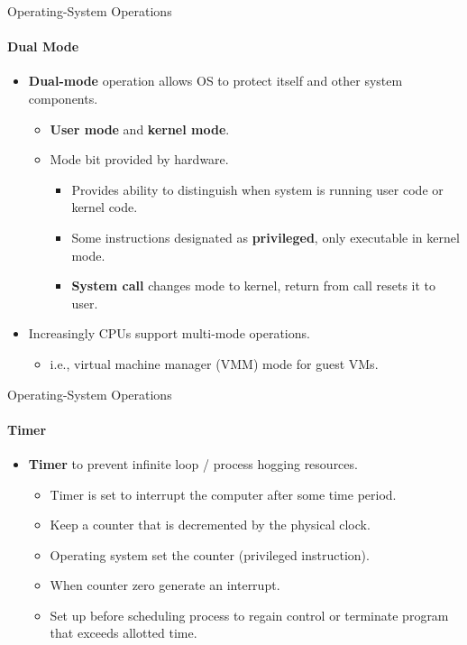 \documentclass[10pt]{beamer}
\begin{document}
\begin{frame}{Operating-System Operations}
\framesubtitle{Dual Mode}
\begin{itemize}
\item \textbf{\alert{Dual-mode}} operation allows OS to protect itself and other system components.
\begin{itemize}
\item \textbf{\alert{User mode}} and \textbf{\alert{kernel mode}}.
\item \alert{Mode bit} provided by hardware.
\begin{itemize}
\item Provides ability to distinguish when system is running user code or kernel code.
\item Some instructions designated as \textbf{\alert{privileged}}, only executable in kernel mode.
\item \textbf{\alert{System call}} changes mode to kernel, return from call resets it to user.
\end{itemize}
\end{itemize}
\item Increasingly CPUs support multi-mode operations.
\begin{itemize}
\item i.e., \alert{virtual machine manager} (\alert{VMM}) mode for guest \alert{VMs}.
\end{itemize}
\end{itemize}
\end{frame}


\begin{frame}{Operating-System Operations}
\framesubtitle{Timer}
\begin{itemize}
\item \textbf{\alert{Timer}} to prevent infinite loop / process hogging resources.
\begin{itemize}
\item Timer is set to interrupt the computer after some time period.
\item Keep a counter that is decremented by the physical clock.
\item Operating system set the counter (privileged instruction).
\item When counter zero generate an interrupt.
\item Set up before scheduling process to regain control or terminate program that exceeds allotted time.
\end{itemize}
\end{itemize}
\end{frame}
\end{document}
